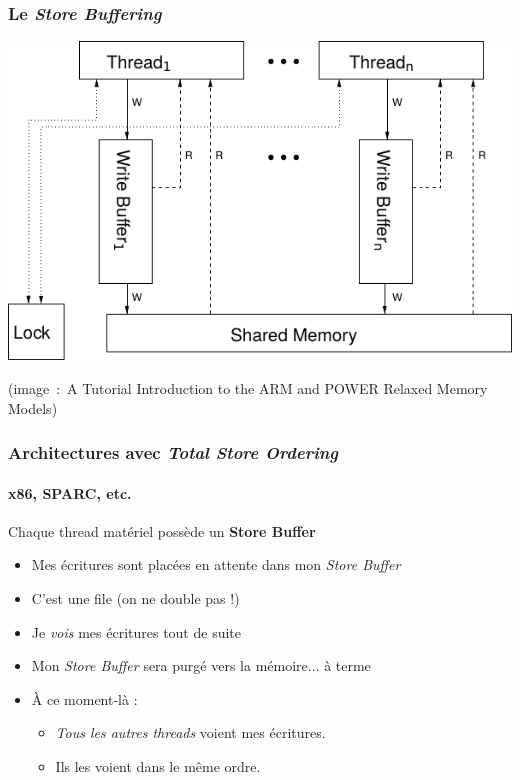 \documentclass[xcolor={x11names,svgnames}]{beamer}
\begin{document}
\begin{frame}[label=tso]
  \frametitle{Le \emph{Store Buffering}}
  
  \centering
  \includegraphics[width=\textwidth]{tso}

  \medskip
  
  \scriptsize (image~:~A Tutorial
    Introduction to the ARM and POWER Relaxed Memory Models)
\end{frame}


\begin{frame}[label=tso]
  \frametitle{Architectures avec \emph{Total Store Ordering}}
  \framesubtitle{x86, SPARC, etc.}
  
  \begin{block}{Chaque thread \alert{matériel} possède un \textbf{Store Buffer}}
    \begin{itemize}
    \item Mes écritures sont placées en attente dans mon \emph{Store Buffer}
    \item C'est une file (on ne double pas !)
    \item Je \emph{vois} mes écritures tout de suite
    \item Mon \emph{Store Buffer} \alert{sera} \og purgé\fg{} vers la mémoire... à terme
    \item À ce moment-là :
      \begin{itemize}
      \item  \emph{Tous les autres threads} voient mes écritures.
      \item Ils les voient dans le même ordre.
      \end{itemize}
    \end{itemize}
  \end{block}
\end{frame}
\end{document}
